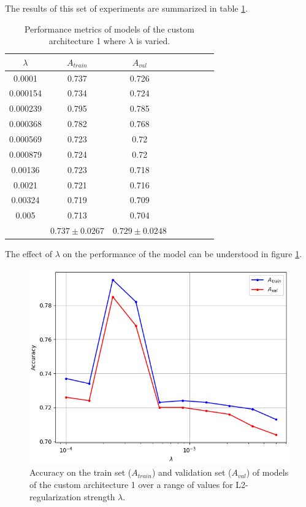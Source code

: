 The results of this set of experiments are summarized in table \ref{table:custom1_all}.

\begin{table}[ht]
\centering
\begin{tabular}{ |c|c|c|c|c|c|c|c| }
\hline
$\lambda$ & $A_{train}$ & $A_{val}$ \\
\hline
0.0001 & 0.737 & 0.726 \\
0.000154 & 0.734 & 0.724 \\
0.000239 & 0.795 & 0.785 \\
0.000368 & 0.782 & 0.768 \\
0.000569 & 0.723 & 0.72 \\
0.000879 & 0.724 & 0.72 \\
0.00136 & 0.723 & 0.718 \\
0.0021 & 0.721 & 0.716 \\
0.00324 & 0.719 & 0.709 \\
0.005 & 0.713 & 0.704 \\
\hline
 & $0.737\pm0.0267$ & $0.729\pm0.0248$ \\
\hline
\end{tabular}
\caption{Performance metrics of models of the custom architecture 1 where $\lambda$ is varied.}
\label{table:custom1_all}
\end{table}

The effect of $\lambda$ on the performance of the model can be understood in figure \ref{fig:custom1_lambda}.

\begin{figure}[ht]
    \centering
    \includegraphics[width=1.0\textwidth]{figs/custom1_lambda.png}
    \caption{Accuracy on the train set ($A_{train}$) and validation set ($A_{val}$) of models of the custom architecture 1 over a range of values for L2-regularization strength $\lambda$.}
    \label{fig:custom1_lambda}
\end{figure}

